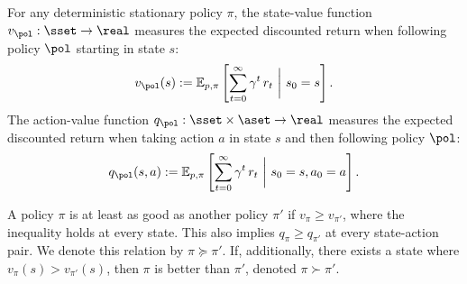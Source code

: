 For any deterministic stationary policy $\pi$,
the state-value function $v_\pol : \sset \to \real$ 
measures the expected discounted return when following policy $\pol$ starting in state $s$:
\begin{align*} 
    v_\pol(s)
    :=
    \mathbb E_{p, \pi} \left[ \sum_{t=0}^{\infty} \gamma^t \, r_t  \ \bigg| \ s_0 = s \right] .
\end{align*}
The action-value function $q_\pol : \sset \times \aset \to \real$ measures the expected discounted return when taking action $a$ in state $s$ and then following policy $\pol$:
\begin{align*} 
    q_\pol(s,a)
    :=
    \mathbb E_{p, \pi} \left[ \sum_{t=0}^{\infty} \gamma^t \, r_t  \ \bigg| \ s_0 = s, a_0 = a \right] .
\end{align*}

A policy $\pi$ is at least as good as another policy $\pi'$ if $v_{\pi} \ge v_{\pi'}$, where the inequality holds at every state.
This also implies $q_{\pi} \ge q_{\pi'}$ at every state-action pair.
We denote this relation by $\pi \succeq \pi'$.
If, additionally, there exists a state where $v_{\pi}(s) > v_{\pi'}(s)$, then $\pi$ is better than $\pi'$, denoted $\pi \succ \pi'$.


